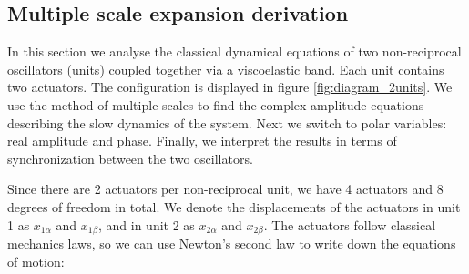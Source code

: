 \documentclass[11pt, a4paper]{article} %
\begin{document}
\begin{appendices}
\section{Multiple scale expansion derivation}
\label{subsec:2units_mse_derivation}


In this section we analyse the classical dynamical equations of two non-reciprocal oscillators (units) coupled together via a viscoelastic band. 
Each unit contains two actuators. The configuration is displayed in figure \ref{fig:diagram_2units}.
We use the method of multiple scales to find the complex amplitude equations describing the slow dynamics of the system. 
Next we switch to polar variables: real amplitude and phase. Finally, we interpret the results in terms of synchronization between the two oscillators.

Since there are 2 actuators per non-reciprocal unit, we have 4 actuators and 8 degrees of freedom in total. 
We denote the displacements of the actuators in unit 1 as $x_{1\alpha}$ and $x_{1\beta}$, and in unit 2 as $x_{2\alpha}$ and $x_{2\beta}$. 
The actuators follow classical mechanics laws, so we can use Newton's second law to write down the equations of motion:


\end{appendices}
\end{document}
